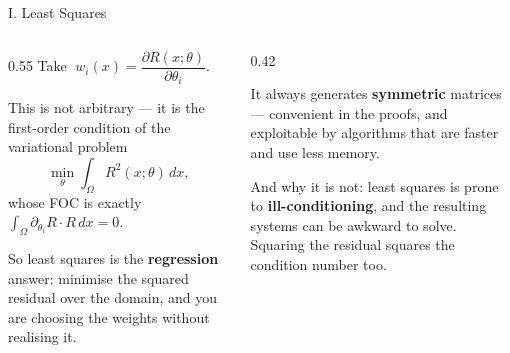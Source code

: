 \begin{frame}{I. Least Squares}
\begin{columns}[T]
\begin{column}{0.55\textwidth}
\small
Take $\;w_i(x)=\dfrac{\partial R(x;\theta)}{\partial\theta_i}$.
\medskip

This is not arbitrary --- it is the first-order condition of the variational problem
\[
  \min_{\theta}\int_{\Omega}R^{2}(x;\theta)\,dx,
\]
whose FOC is exactly $\int_\Omega \partial_{\theta_i}R\cdot R\,dx=0$.
\medskip

So least squares is the \textbf{regression} answer: minimise the squared residual over the domain, and you are choosing the weights without realising it.
\end{column}
\begin{column}{0.42\textwidth}
\begin{conceptbox}[title=\textbf{Why it is attractive}]\small
It always generates \textbf{symmetric} matrices --- convenient in the proofs, and exploitable by algorithms that are faster and use less memory.
\end{conceptbox}
\medskip
\begin{cautionbox}\footnotesize
And why it is not: least squares is prone to \textbf{ill-conditioning}, and the resulting systems can be awkward to solve. Squaring the residual squares the condition number too.
\end{cautionbox}
\end{column}
\end{columns}
\vspace{1mm}
\end{frame}

